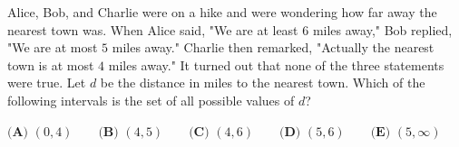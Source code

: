 Alice, Bob, and Charlie were on a hike and were wondering how far away the nearest town was. When Alice said, "We are at least $6$ miles away," Bob replied, "We are at most $5$ miles away." Charlie then remarked, "Actually the nearest town is at most $4$ miles away." It turned out that none of the three statements were true. Let $d$ be the distance in miles to the nearest town. Which of the following intervals is the set of all possible values of $d$?



$\textbf{(A) }   (0,4)   \qquad        \textbf{(B) }   (4,5)   \qquad    \textbf{(C) }   (4,6)   \qquad   \textbf{(D) }  (5,6)  \qquad  \textbf{(E) }   (5,\infty)$
